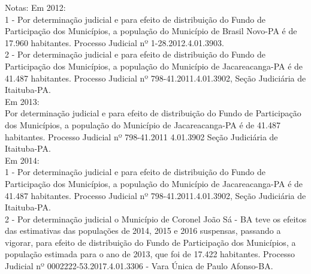 \begin{flushright}
    \begin{minipage}[b]{13.9cm}
        \begin{SingleSpace}
            \begin{footnotesize}
                Notas: Em 2012: \\
                \hspace*{0.9cm}
                1 - Por determinação judicial e para efeito de distribuição do Fundo de Participação dos Municípios, a população do Município de Brasil Novo-PA é de 17.960 habitantes. Processo Judicial nº 1-28.2012.4.01.3903. \\
                \hspace*{0.9cm} 2 - Por determinação judicial e para efeito de distribuição do Fundo de Participação dos Municípios, a população do Município de Jacareacanga-PA é de 41.487 habitantes. Processo Judicial nº 798-41.2011.4.01.3902, Seção Judiciária de Itaituba-PA. \\
                \hspace*{0.9cm} Em 2013: \\
                \hspace*{0.9cm} Por determinação judicial e para efeito de distribuição do Fundo de Participação dos Municípios, a população do Município de Jacareacanga-PA é de 41.487 habitantes. Processo Judicial nº 798-41.2011 4.01.3902 Seção Judiciária de Itaituba-PA. \\
                \hspace*{0.9cm} Em 2014: \\
                \hspace*{0.9cm}1 - Por determinação judicial e para efeito de distribuição do Fundo de Participação dos Municípios, a população do Município de Jacareacanga-PA é de 41.487 habitantes. Processo Judicial nº 798-41.2011.4.01.3902, Seção Judiciária de Itaituba-PA. \\
                \hspace*{0.9cm} 2 - Por determinação judicial o Município de Coronel João Sá - BA teve os efeitos das estimativas das populações de 2014, 2015 e 2016 suspensas, passando a vigorar, para efeito de distribuição do Fundo de Participação dos Municípios, a população estimada para o ano de 2013, que foi de 17.422 habitantes. Processo Judicial nº 0002222-53.2017.4.01.3306 - Vara Única de Paulo Afonso-BA.
            \end{footnotesize}
        \end{SingleSpace}
    \end{minipage}
\end{flushright}

